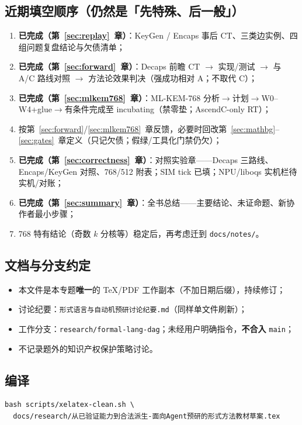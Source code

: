 \documentclass[UTF8,a4paper,11pt]{ctexart}
\theoremstyle{definition}
\theoremstyle{plain}
\theoremstyle{remark}
\numberwithin{figure}{section}
\numberwithin{table}{section}
\begin{document}
\subsection{近期填空顺序（仍然是「先特殊、后一般」）}
\begin{enumerate}
  \item \textbf{已完成（第~\ref{sec:replay}~章）}：KeyGen / Encaps 事后 $\mathrm{CT}$、三类边实例、四组问题复盘结论与欠债清单；
  \item \textbf{已完成（第~\ref{sec:forward}~章）}：Decaps 前瞻 $\mathrm{CT}$ $\to$ 实现/测试 $\to$ 与 A/C 路线对照 $\to$ 方法论效果判决（强成功相对 A；不取代 C）；
  \item \textbf{已完成（第~\ref{sec:mlkem768}~章）}：ML-KEM-768 分析$\to$计划$\to$W0--W4+glue$\to$有条件完成至 incubating（禁零垫；AscendC-only RT）；
  \item 按第~\ref{sec:forward}/\ref{sec:mlkem768}~章反馈，必要时回改第~\ref{sec:mathbg}--\ref{sec:gates}~章定义（只记欠债；假绿/工具化门禁仍欠）；
  \item \textbf{已完成（第~\ref{sec:correctness}~章）}：对照实验章——Decaps 三路线、Encaps/KeyGen 对照、768/512 附表；SIM tick 已填；NPU/liboqs 实机栏待实机/对账；
  \item \textbf{已完成（第~\ref{sec:summary}~章）}：全书总结——主要结论、未证命题、新协作者最小步骤；
  \item 768 特有结论（奇数 $k$ 分核等）稳定后，再考虑迁到 \texttt{docs/notes/}。
\end{enumerate}

\subsection{文档与分支约定}
\begin{itemize}
  \item 本文件是本专题\textbf{唯一}的 TeX/PDF 工作副本（不加日期后缀），持续修订；
  \item 讨论纪要：\texttt{形式语言与自动机预研讨论纪要.md}（同样单文件刷新）；
  \item 工作分支：\texttt{research/formal-lang-dag}；未经用户明确指令，\textbf{不合入} \texttt{main}；
  \item 不记录题外的知识产权保护策略讨论。
\end{itemize}

\subsection{编译}
\begin{lstlisting}
bash scripts/xelatex-clean.sh \
  docs/research/从已验证能力到合法派生-面向Agent预研的形式方法教材草案.tex
\end{lstlisting}
\end{document}
